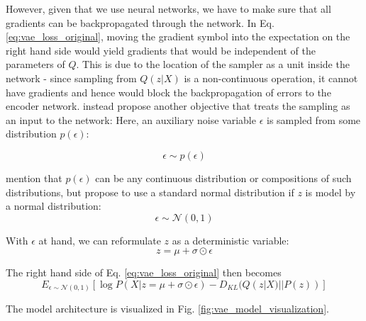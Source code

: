 \documentclass[6pt]{article}
\begin{document}
{However, given that we use neural networks, we have to make sure that all gradients can be backpropagated through the network. In Eq. \ref{eq:vae_loss_original}, moving the gradient symbol into the expectation on the right hand side would yield gradients that would be independent of the parameters of $Q$. This is due to the location of the sampler as a unit inside the network - since sampling from $Q(z|X)$ is a non-continuous operation, it cannot have gradients and hence would block the backpropagation of errors to the encoder network. \cite{kingma2013auto} instead propose another objective that treats the sampling as an input to the network: Here, an auxiliary noise variable $\epsilon$ is sampled from some distribution $p(\epsilon)$:

\begin{equation}
\epsilon \sim p(\epsilon)
\end{equation}

\cite{kingma2013auto} mention that  $p(\epsilon)$ can be any continuous distribution or compositions of such distributions, but propose to use a standard normal distribution if $z$ is model by a normal distribution:
\begin{equation}
\epsilon \sim \mathcal{N}(0,1)
\end{equation}

With $\epsilon$ at hand, we can reformulate $z$ as a deterministic variable:
\begin{equation}
z = \mu + \sigma \odot \epsilon
\end{equation}

The right hand side of Eq. \ref{eq:vae_loss_original} then becomes
\begin{equation}
\label{eq:vae_loss_reparameterized}
E_{\epsilon \sim \mathcal{N}(0,1)}[\log P(X|z= \mu + \sigma \odot \epsilon) - D_{KL}(Q(z|X)||P(z))] 
\end{equation}

The model architecture is visualized in Fig. \ref{fig:vae_model_visualization}. 

}
\end{document}
